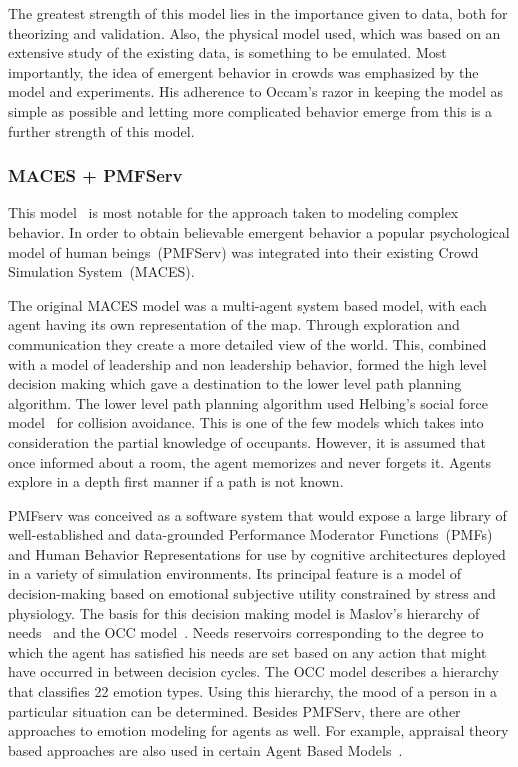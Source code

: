 The greatest strength of this model lies in the importance given to data, both for theorizing and validation. Also, the physical model used, which was based on an extensive study of the existing data, is something to be emulated. Most importantly, the idea of emergent behavior in crowds was emphasized by the model and experiments. His adherence to Occam's razor in keeping the model as simple as possible and letting more complicated behavior emerge from this is a further strength of this model.


\subsubsection{MACES + PMFServ}
\label{MACESPMFServ}

This model~\cite{Pelechano:2005vp} is most notable for the approach taken to modeling complex behavior. In order to obtain believable emergent behavior a popular psychological model of human beings~(PMFServ) was integrated into their existing Crowd Simulation System~(MACES).

The original MACES model was a multi-agent system based model, with each agent having its own representation of the map. Through exploration and communication they create a more detailed view of the world. This, combined with a model of leadership and non leadership behavior, formed the high level decision making which gave a destination to the lower level path planning algorithm. The lower level path planning algorithm used Helbing's social force model~\cite{Helbing:1995ie} for collision avoidance. This is one of the few models which takes into consideration the partial knowledge of occupants. However, it is assumed that once informed about a room, the agent memorizes and never forgets it. Agents explore in a depth first manner if a path is not known.

PMFserv was conceived as a software system that would expose a large library of well-established and data-grounded Performance Moderator Functions~(PMFs) and Human Behavior Representations for use by cognitive architectures deployed in a variety of simulation environments. Its principal feature is a model of decision-making based on emotional subjective utility constrained by stress and physiology. The basis for this decision making model is Maslov's hierarchy of needs~\cite{Maslow:1943vr} and the OCC model~\cite{Orton:1990tx}. Needs reservoirs corresponding to the degree to which the agent has satisfied his needs are set based on any action that might have occurred in between decision cycles. The OCC model describes a hierarchy that classifies 22 emotion types. Using this hierarchy, the mood of a person in a particular situation can be determined. Besides PMFServ, there are other approaches to emotion modeling for agents as well. For example, appraisal theory based approaches are also used in certain Agent Based Models~\cite{Aydt:2011wz}.

